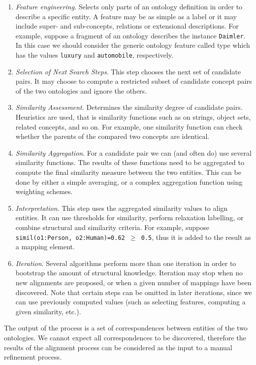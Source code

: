 \documentclass{fast_latex}
\begin{document}
\begin{enumerate}
\item \textit{Feature engineering}. Selects only parts of an ontology
definition in order to describe a specific entity. A feature may be as
simple as a label or it may include super- and sub-concepts, relations
or extensional descriptions.\newline
For example, suppose a fragment of an ontology describes the instance
\texttt{Daimler}. In this case we should consider the
generic ontology feature called type which has the values
\texttt{luxury} and \texttt{automobile},
respectively. 
\item \textit{Selection of Next Search Steps}. This step chooses the
next set of candidate pairs. It may choose to compute a restricted
subset of candidate concept pairs of the two ontologies and ignore the
others. 
\item \textit{Similarity Assessment.} Determines the similarity degree
of candidate pairs. Heuristics are used, that is similarity functions
such as on strings, object sets, related concepts, and so on.\newline
For example, one similarity function can check whether the parents of
the compared two concepts are identical. 
\item \textit{Similarity Aggregation}. For a candidate pair we can (and
often do) use several similarity functions. The results of these
functions need to be aggregated to compute the final similarity measure
between the two entities. This can be done by either a simple
averaging, or a complex aggregation function using weighting schemes. 
\item \textit{Interpretation}. This step uses the aggregated similarity
values to align entities. It can use thresholds for similarity, perform
relaxation labelling, or combine structural and similarity
criteria.\newline
For example, suppose \texttt{simil(o1:Person,
o2:Human)=0.62 ${\geq}$ 0.5}, thus it is added to the result as a
mapping element. 
\item \textit{Iteration}. Several algorithms perform more than one
iteration in order to bootstrap the amount of structural knowledge.
Iteration may stop when no new alignments are proposed, or when a given
number of mappings have been discovered. Note that certain steps can be
omitted in later iterations, since we can use previously computed
values (such as selecting features, computing a given similarity,
etc.). 
\end{enumerate}
The output of the process is a set of correspondences between entities
of the two ontologies. We cannot expect all correspondences to be
discovered, therefore the results of the alignment process can be
considered as the input to a manual refinement process. 
\end{document}
